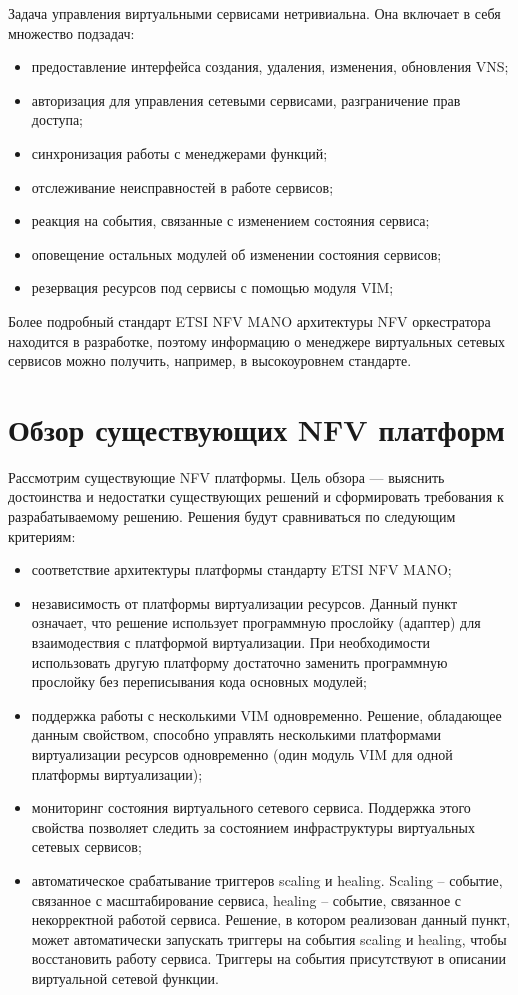 \documentclass[oneside,final,14pt,a4paper]{extreport}
\begin{document}
Задача управления виртуальными сервисами нетривиальна. Она включает в себя множество подзадач:

\begin{itemize}
	\item предоставление интерфейса создания, удаления, изменения, обновления VNS;
	\item авторизация для управления сетевыми сервисами, разграничение прав доступа;
	\item синхронизация работы с менеджерами функций;
	\item отслеживание неисправностей в работе сервисов;
	\item реакция на события, связанные с изменением состояния сервиса;
	\item оповещение остальных модулей об изменении состояния сервисов;
	\item резервация ресурсов под сервисы с помощью модуля VIM;
\end{itemize}

Более подробный стандарт ETSI NFV MANO архитектуры NFV оркестратора находится в разработке, поэтому информацию о менеджере виртуальных сетевых сервисов можно получить, например, в высокоуровнем стандарте.\cite{nfv-mano-official-2016-04}





\chapter{Обзор существующих NFV платформ}
\label{nfv_platform_overview}
Рассмотрим существующие NFV платформы. Цель обзора --- выяснить достоинства и недостатки существующих решений и сформировать требования к разрабатываемому решению. Решения будут сравниваться по следующим критериям:
\begin{itemize}
	\item соответствие архитектуры платформы стандарту ETSI NFV MANO;
	\item независимость от платформы виртуализации ресурсов. Данный пункт означает, что решение использует программную прослойку (адаптер) для взаимодествия с платформой виртуализации. При необходимости использовать другую платформу достаточно заменить программную прослойку без переписывания кода основных модулей;
	\item поддержка работы с несколькими VIM одновременно. Решение, обладающее данным свойством, способно управлять несколькими платформами виртуализации ресурсов одновременно (один модуль VIM для одной платформы виртуализации);
	\item мониторинг состояния виртуального сетевого сервиса. Поддержка этого свойства позволяет следить за состоянием инфраструктуры виртуальных сетевых сервисов;
	\item автоматическое срабатывание триггеров scaling и healing. Scaling -- событие, связанное с масштабирование сервиса, healing -- событие, связанное с некорректной работой сервиса. Решение, в котором реализован данный пункт, может автоматически запускать триггеры на события scaling и healing, чтобы восстановить работу сервиса. Триггеры на события присутствуют в описании виртуальной сетевой функции.
\end{itemize}
\end{document}
